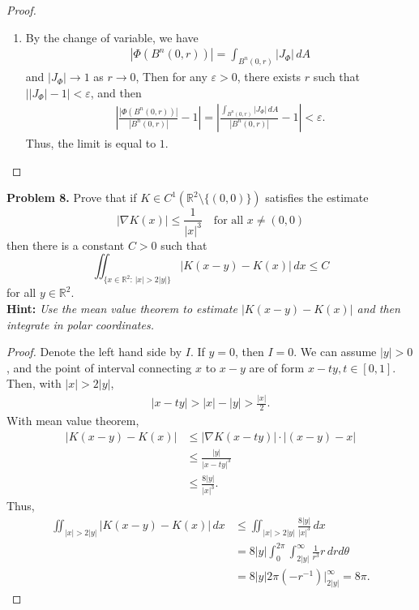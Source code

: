 \documentclass[12pt,leqno]{amsart}
\theoremstyle{definition}
\begin{document}
\begin{proof}
\begin{enumerate}[label=(\alph*)]
    \item By the change of variable, we have
    \begin{align*}
        \left|\Phi(B^n(0,r))\right| = \int_{B^n(0,r)} |J_\Phi|\, dA
    \end{align*}
    and $|J_\Phi| \to 1$ as $r \to 0$, Then for any $\varepsilon > 0$, there exists $r$ such that $\left||J_\Phi| - 1\right| < \varepsilon$, and then
    \begin{align*}
        \left|\frac{|\Phi(B^n(0,r))|}{|B^n(0,r)|} - 1\right| = \left|\frac{\int_{B^n(0,r)} |J_\Phi|\, dA}{|B^n(0,r)|} - 1\right|< \varepsilon.
    \end{align*}
    Thus, the limit is equal to $1$.
\end{enumerate}
\end{proof}


\medskip


\noindent
{\bf Problem 8.}
Prove that if $K\in C^1(\mathbb{R}^2\setminus
\{ (0,0)\})$ satisfies the estimate
$$
|\nabla K(x)|\leq \frac{1}{|x|^3} \quad \mbox{for all $x\neq (0,0)$}
$$
then there is a constant $C>0$ such that
$$
\iint_{\{x\in\mathbb{R}^2:\, |x|>2|y|\}} |K(x-y)-K(x)|\, dx\leq C
$$
for all $y\in\mathbb{R}^2$.\\
{\bf Hint:} {\em Use the mean value theorem to estimate
	$|K(x-y)-K(x)|$ and then integrate in polar coordinates.}
\begin{proof}
Denote the left hand side by $I$. If $y = 0$, then $I = 0$. We can assume $|y| > 0$, and the point of interval connecting $x$ to $x - y$ are of form $x - ty, t \in [0,1]$. Then, with $|x| > 2|y|$,
\begin{align*}
    |x - ty| > |x| - |y| > \frac{|x|}{2}.
\end{align*}
With mean value theorem, 
\begin{align*}
    |K(x-y) - K(x)| & \leq |\nabla K(x-ty)| \cdot |(x - y) - x| \\
    & \leq \frac{|y|}{|x-ty|^3} \\
    & \leq \frac{8|y|}{|x|^3}.
\end{align*}
Thus,
\begin{align*}
    \iint_{|x|>2|y|} |K(x-y)-K(x)|\, dx & \leq \iint_{|x|>2|y|} \frac{8|y|}{|x|^3}\, dx \\
    & = 8|y| \int^{2\pi}_0 \int^\infty_{2|y|} \frac{1}{r^3}r\, dr d\theta \\
    & = 8|y| 2\pi \left(- r^{-1}\right)\Big|_{2|y|}^\infty = 8 \pi.
\end{align*}
\end{proof}
\end{document}
